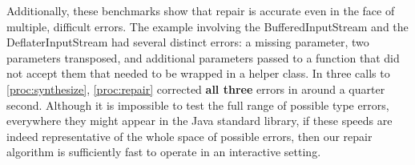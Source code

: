 Additionally, these benchmarks show that repair is accurate even in
the face of multiple, difficult errors. The example involving the
BufferedInputStream and the DeflaterInputStream had several distinct
errors: a missing parameter, two parameters transposed, and additional
parameters passed to a function that did not accept them that needed
to be wrapped in a helper class. In three calls to
\ref{proc:synthesize}, \ref{proc:repair} corrected \textbf{all three}
errors in around a quarter second. Although it is impossible to test
the full range of possible type errors, everywhere they might appear
in the Java standard library, if these speeds are indeed
representative of the whole space of possible errors, then our repair
algorithm is sufficiently fast to operate in an interactive setting.
